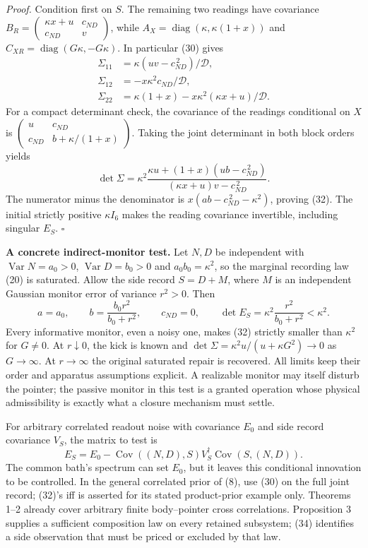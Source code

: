 \documentclass[11pt,a4paper]{article}
\begin{document}
\emph{Proof.} Condition first on \(S\). The remaining two readings have
covariance
\(B_R=\left(\begin{smallmatrix}\kappa x+u&c\!_{ND}\\ c\!_{ND}&v\end{smallmatrix}\right)\),
while \(A_X=\operatorname{diag}(\kappa,\kappa(1+x))\) and
\(C_{XR}=\operatorname{diag}(G\kappa,-G\kappa)\). In particular (30)
gives \[\begin{aligned}
\Sigma_{11}&=\kappa(uv-c\!_{ND}^{\,2})/\mathcal D,\\
\Sigma_{12}&=-x\kappa^2c\!_{ND}/\mathcal D,\\
\Sigma_{22}&=\kappa(1+x)-x\kappa^2(\kappa x+u)/\mathcal D.
\end{aligned}\tag{33}\] For a compact determinant check, the covariance
of the readings conditional on \(X\) is
\(\left(\begin{smallmatrix}u&c\!_{ND}\\c\!_{ND}&b+\kappa/(1+x) \end{smallmatrix}\right)\).
Taking the joint determinant in both block orders yields \[\det\Sigma
=\kappa^2\frac{\kappa u+(1+x)(ub-c\!_{ND}^{\,2})}
                    {(\kappa x+u)v-c\!_{ND}^{\,2}}.\] The numerator
minus the denominator is \(x(ab-c\!_{ND}^{\,2}-\kappa^2)\), proving
(32). The initial strictly positive \(\kappa I_6\) makes the reading
covariance invertible, including singular \(E_S\). \(\square\)

\textbf{A concrete indirect-monitor test.} Let \(N,D\) be independent
with \(\operatorname{Var}N=a_0>0\), \(\operatorname{Var}D=b_0>0\) and
\(a_0b_0=\kappa^2\), so the marginal recording law (20) is saturated.
Allow the side record \(S=D+M\), where \(M\) is an independent Gaussian
monitor error of variance \(r^2>0\). Then
\[a=a_0,\qquad b=\frac{b_0r^2}{b_0+r^2},\qquad c\!_{ND}=0,
\qquad\det E_S=\kappa^2\frac{r^2}{b_0+r^2}<\kappa^2.\tag{34}\] Every
informative monitor, even a noisy one, makes (32) strictly smaller than
\(\kappa^2\) for \(G\ne0\). At \(r\downarrow0\), the kick is known and
\(\det\Sigma=\kappa^2u/(u+\kappa G^2)\to0\) as \(G\to\infty\). At
\(r\to\infty\) the original saturated repair is recovered. All limits
keep their order and apparatus assumptions explicit. A realizable
monitor may itself disturb the pointer; the passive monitor in this test
is a granted operation whose physical admissibility is exactly what a
closure mechanism must settle.

For arbitrary correlated readout noise with covariance \(E_0\) and side
record covariance \(V_S\), the matrix to test is
\[E_S=E_0-\operatorname{Cov}((N,D),S)V_S^\dagger
                 \operatorname{Cov}(S,(N,D)).\tag{35}\] The common
bath's spectrum can set \(E_0\), but it leaves this conditional
innovation to be controlled. In the general correlated prior of (8), use
(30) on the full joint record; (32)'s iff is asserted for its stated
product-prior example only. Theorems 1--2 already cover arbitrary finite
body--pointer cross correlations. Proposition 3 supplies a sufficient
composition law on every retained subsystem; (34) identifies a side
observation that must be priced or excluded by that law.
\end{document}
